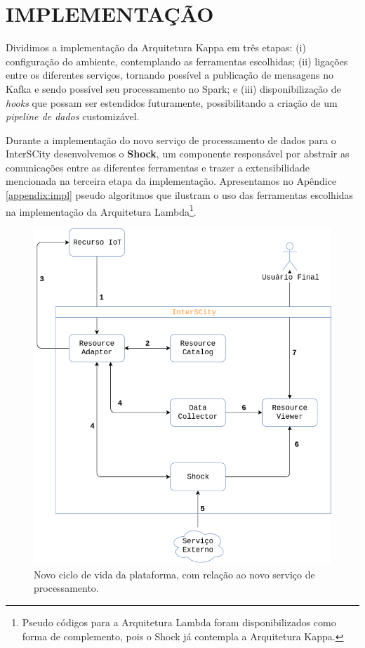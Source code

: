 \section{IMPLEMENTAÇÃO}

Dividimos a implementação da Arquitetura Kappa em três etapas:
(i) configuração do ambiente, contemplando as ferramentas escolhidas;
(ii) ligações entre os diferentes serviços, tornando possível a publicação de
    mensagens no Kafka e sendo possível seu processamento no Spark; e
(iii) disponibilização de \textit{hooks} que possam ser estendidos futuramente,
    possibilitando a criação de um \textit{pipeline de dados} customizável.

Durante a implementação do novo serviço de processamento de dados para o
InterSCity desenvolvemos o \textbf{Shock},
um componente responsável por abstrair as comunicações entre as diferentes
ferramentas e trazer a extensibilidade mencionada na terceira etapa da
implementação. Apresentamos no Apêndice \ref{appendix:impl}
pseudo algoritmos que ilustram o uso das ferramentas escolhidas na
implementação da Arquitetura Lambda\footnote{
Pseudo códigos para a Arquitetura Lambda foram disponibilizados como forma
de complemento, pois o Shock já contempla a Arquitetura Kappa.
}.

\begin{figure}
  \centering
    \includegraphics[scale=0.45]{figuras/shock_usage.png}
    \caption{Novo ciclo de vida da plataforma, com relação ao novo serviço de processamento.}
  \label{fig:shock_usage}
\end{figure}

